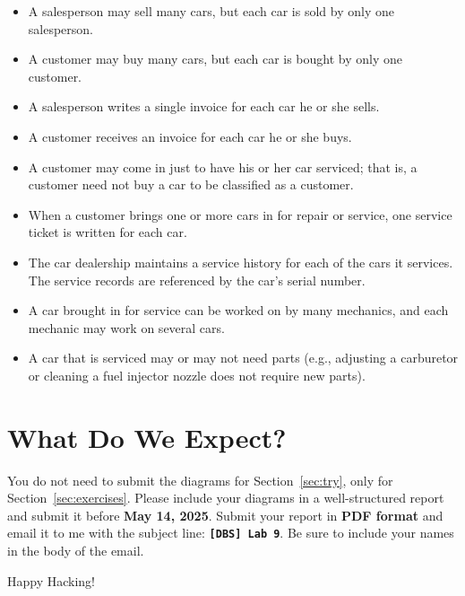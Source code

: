\documentclass{article}
\begin{document}
\begin{enumerate}
        \begin{itemize}
            \item A salesperson may sell many cars, but each car is sold by only one salesperson.
            \item A customer may buy many cars, but each car is bought by only one customer.
            \item A salesperson writes a single invoice for each car he or she sells.
            \item A customer receives an invoice for each car he or she buys.
            \item A customer may come in just to have his or her car serviced; that is, a customer need not buy a car to be classified as a customer.
            \item When a customer brings one or more cars in for repair or service, one service ticket is written for each car.
            \item The car dealership maintains a service history for each of the cars it services. The service records are referenced by the car’s serial number.
            \item A car brought in for service can be worked on by many mechanics, and each mechanic may work on several cars.
            \item A car that is serviced may or may not need parts (e.g., adjusting a carburetor or cleaning a fuel injector nozzle does not require new parts).
        \end{itemize}
\end{enumerate}

\section{What Do We Expect?}
You do not need to submit the diagrams for Section~\ref{sec:try}, only for Section~\ref{sec:exercises}. Please include your diagrams in a well-structured report and submit it before \textbf{May 14, 2025}. Submit your report in \textbf{PDF format} and email it to me with the subject line: {\LARGE \textbf{\texttt{[DBS] Lab 9}}}. Be sure to include your names in the body of the email.


\vspace{5mm}
Happy Hacking! 
\end{document}
